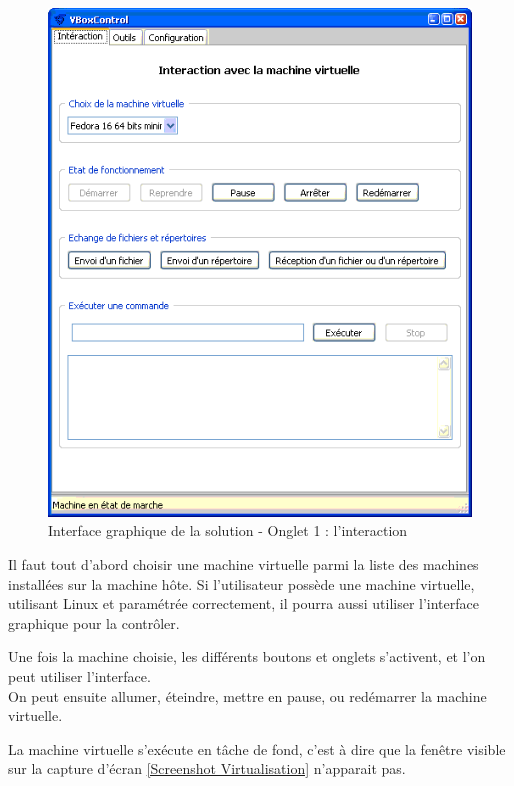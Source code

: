 \begin{figure}[!h]
	\center
	\includegraphics[scale=0.6]{images/Interface_solution_1.png}
	\caption{Interface graphique de la solution - Onglet 1 : l'interaction}
	\label{Interface graphique de la solution - Onglet 1 : l'interaction}
\end{figure}


Il faut tout d'abord choisir une machine virtuelle parmi la liste des machines installées sur la machine hôte.
Si l'utilisateur possède une machine virtuelle, utilisant Linux et paramétrée correctement, il pourra aussi utiliser l'interface graphique pour la contrôler.

Une fois la machine choisie, les différents boutons et onglets s'activent, et l'on peut utiliser l'interface.
\\


On peut ensuite allumer, éteindre, mettre en pause, ou redémarrer la machine virtuelle.

La machine virtuelle s'exécute en tâche de fond, c'est à dire que la fenêtre visible sur la capture d'écran \ref{Screenshot Virtualisation} n'apparait pas.
\\


